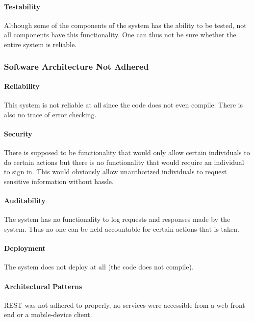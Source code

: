\documentclass{article}
\begin{document}
			\paragraph{Testability} Although some of the components of the system has the ability to be tested, not all components have this functionality. One can thus not be sure whether the entire system is reliable.			
			
		\subsubsection{Software Architecture Not Adhered}
			\paragraph{Reliability} This system is not reliable at all since the code does not even compile. There is also no trace of error checking.
			\paragraph{Security} There is supposed to be functionality that would only allow certain individuals to do certain actions but there is no functionality that would require an individual to sign in. This would obviously allow unauthorized individuals to request sensitive information without hassle.
			\paragraph{Auditability} The system has no functionality to log requests and responses made by the system. Thus no one can be held accountable for certain actions that is taken.
			\paragraph{Deployment} The system does not deploy at all (the code does not compile).
			\paragraph{Architectural Patterns} REST was not adhered to properly, no services were accessible from a web front-end or a mobile-device client.
\end{document}
